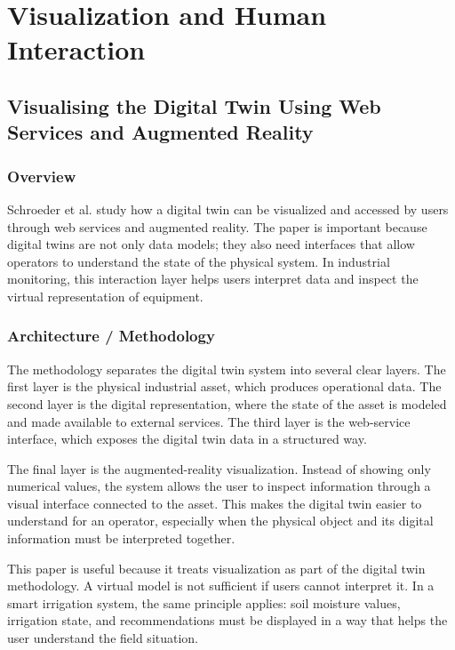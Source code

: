 \section{Visualization and Human Interaction}

\subsection[Visualising the Digital Twin Using Web Services and Augmented Reality]{Visualising the Digital Twin Using Web Services and Augmented Reality \cite{schroeder2016visualisingDigitalTwin}}

\subsubsection{Overview}

Schroeder et al. study how a digital twin can be visualized and accessed by users through web services and augmented reality. The paper is important because digital twins are not only data models; they also need interfaces that allow operators to understand the state of the physical system. In industrial monitoring, this interaction layer helps users interpret data and inspect the virtual representation of equipment.

\subsubsection{Architecture / Methodology}

The methodology separates the digital twin system into several clear layers. The first layer is the physical industrial asset, which produces operational data. The second layer is the digital representation, where the state of the asset is modeled and made available to external services. The third layer is the web-service interface, which exposes the digital twin data in a structured way.

The final layer is the augmented-reality visualization. Instead of showing only numerical values, the system allows the user to inspect information through a visual interface connected to the asset. This makes the digital twin easier to understand for an operator, especially when the physical object and its digital information must be interpreted together.

This paper is useful because it treats visualization as part of the digital twin methodology. A virtual model is not sufficient if users cannot interpret it. In a smart irrigation system, the same principle applies: soil moisture values, irrigation state, and recommendations must be displayed in a way that helps the user understand the field situation.


